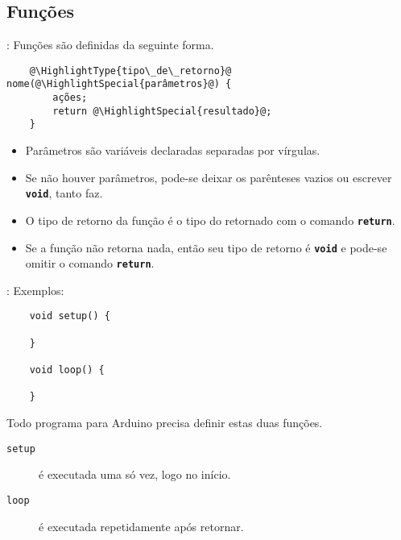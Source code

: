 \subsection{Funções}


\begin{frame}[fragile]{\insertsection: \insertsubsection}
  Funções são definidas da seguinte forma.
  \begin{verbatim}
    @\HighlightType{tipo\_de\_retorno}@ nome(@\HighlightSpecial{parâmetros}@) {
    	ações;
    	return @\HighlightSpecial{resultado}@;
    }
  \end{verbatim}

  \begin{itemize}
    \item Parâmetros são variáveis declaradas separadas por vírgulas.
    \item Se não houver parâmetros, pode-se deixar os parênteses vazios ou escrever \texttt{\textbf{void}}, tanto faz.
    \item O tipo de retorno da função é o tipo do  retornado com o comando \texttt{\textbf{return}}.
    \item Se a função não retorna nada, então seu tipo de retorno é \texttt{\textbf{void}} e pode-se omitir o comando \texttt{\textbf{return}}.
  \end{itemize}
\end{frame}


\begin{frame}[fragile]{\insertsection: \insertsubsection}
  Exemplos:
  \begin{verbatim}
    void setup() {

    }

    void loop() {

    }
  \end{verbatim}

  Todo programa para Arduino precisa definir estas duas funções.
  \begin{description}
    \item[\texttt{setup}] é executada uma só vez, logo no início.
    \item[\texttt{loop}] é executada repetidamente após \texttt{} retornar.
  \end{description}
\end{frame}



